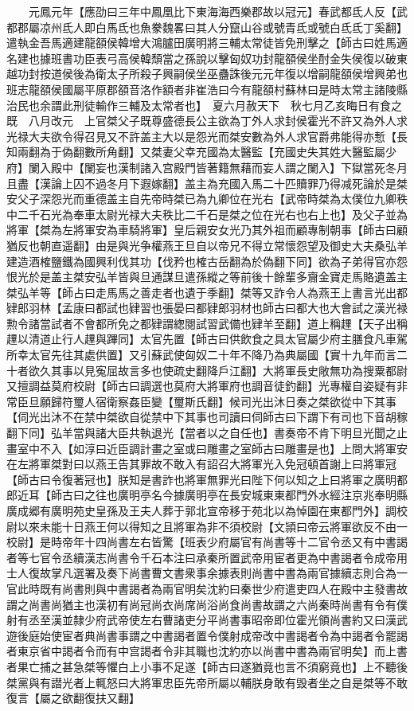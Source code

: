 　　元鳳元年【應劭曰三年中鳳凰比下東海海西樂郡故以冠元】春武都氐人反【武都郡屬凉州氐人即白馬氐也魚豢魏畧曰其人分竄山谷或號青氐或號白氐氐丁奚翻】遣執金吾馬適建龍頟侯韓增大鴻臚田廣明將三輔太常徒皆免刑擊之【師古曰姓馬適名建也據班書功臣表弓高侯韓頹當之孫說以擊匈奴功封龍頟侯坐酎金失侯復以破東越功封按道侯後為衛太子所殺子興嗣侯坐巫蠱誅後元元年復以增嗣龍頟侯增興弟也班志龍頟侯國屬平原郡頟音洛作額者非崔浩曰今有龍頟村蘇林曰是時太常主諸陵縣治民也余謂此刑徒輸作三輔及太常者也】　夏六月赦天下　秋七月乙亥晦日有食之既　八月改元　上官桀父子既尊盛德長公主欲為丁外人求封侯霍光不許又為外人求光禄大夫欲令得召見又不許盖主大以是怨光而桀安數為外人求官爵弗能得亦慙【長知兩翻為于偽翻數所角翻】又桀妻父幸充國為太醫監【充國史失其姓大醫監屬少府】闌入殿中【闌妄也漢制諸入宫殿門皆著籍無藉而妄人謂之闌入】下獄當死冬月且盡【漢論上囚不過冬月下遐嫁翻】盖主為充國入馬二十匹贖罪乃得减死論於是桀安父子深怨光而重德盖主自先帝時桀已為九卿位在光右【武帝時桀為太僕位九卿秩中二千石光為奉車太尉光禄大夫秩比二千石是桀之位在光右也右上也】及父子並為將軍【桀為左將軍安為車騎將軍】皇后親安女光乃其外祖而顧專制朝事【師古曰顧猶反也朝直遥翻】由是與光争權燕王旦自以帝兄不得立常懷怨望及御史大夫桑弘羊建造酒榷鹽鐵為國興利伐其功【伐矜也榷古岳翻為於偽翻下同】欲為子弟得官亦怨恨光於是盖主桀安弘羊皆與旦通謀旦遣孫縱之等前後十餘輩多齎金寶走馬賂遺盖主桀弘羊等【師占曰走馬馬之善走者也遺于季翻】桀等又詐令人為燕王上書言光出都肄郎羽林【孟康曰都試也肄習也張晏曰都肄郎羽材也師古曰都大也大會試之漢光禄勲令諸當試者不會都所免之都肄謂緫閱試習武備也肄羊至翻】道上稱䟆【天子出稱䟆以清道止行人䟆與蹕同】太官先置【師古曰供飲食之具太官屬少府主膳食凡車駕所幸太官先往其處供置】又引蘇武使匈奴二十年不降乃為典屬國【實十九年而言二十者欲久其事以見寃屈故言多也使疏史翻降戶江翻】大將軍長史敞無功為搜粟都尉又擅調益莫府校尉【師古曰調選也莫府大將軍府也調音徒釣翻】光專權自姿疑有非常臣旦願歸符璽人宿衛察姦臣變【璽斯氏翻】候司光出沐日奏之桀欲從中下其事【伺光出沐不在禁中桀欲自從禁中下其事也司讀曰伺師古曰下謂下有司也下音胡稼翻下同】弘羊當與諸大臣共執退光【當者以之自任也】書奏帝不肯下明旦光聞之止畫室中不入【如淳曰近臣調計畫之室或曰雕畫之室師古曰雕畫是也】上問大將軍安在左將軍桀對曰以燕王告其罪故不敢入有詔召大將軍光入免冠頓首謝上曰將軍冠【師古曰令復著冠也】朕知是書詐也將軍無罪光曰陛下何以知之上曰將軍之廣明都郎近耳【師古曰之往也廣明亭名今據廣明亭在長安城東東都門外水經注京兆奉明縣廣成郷有廣明苑史皇孫及王夫人葬于郭北宣帝移于苑北以為悼園在東都門外】調校尉以來未能十日燕王何以得知之且將軍為非不須校尉【文頴曰帝云將軍欲反不由一校尉】是時帝年十四尚書左右皆驚【班表少府屬官有尚書等十二官令丞又有中書謁者等七官令丞續漢志尚書令千石本注曰承秦所置武帝用宦者更為中書謁者令成帝用士人復故掌凡選署及奏下尚書曹文書衆事余據表則尚書中書為兩官據續志則合為一官此時既有尚書則與中書謁者為兩官明矣沈約曰秦世少府遣吏四人在殿中主發書故謂之尚書尚猶主也漢初有尚冠尚衣尚席尚浴尚食尚書故謂之六尚秦時尚書有令有僕射有丞至漢並隸少府武帝使左右曹諸吏分平尚書事昭帝即位霍光領尚書約又曰漢武遊後庭始使宦者典尚書事謂之中書謁者置令僕射成帝改中書謁者令為中謁者令罷謁者東京省中謁者令而有中宫謁者令非其職也沈約亦以尚書中書為兩官明矣】而上書者果亡捕之甚急桀等懼白上小事不足遂【師古曰遂猶竟也言不須窮竟也】上不聽後桀黨與有譛光者上輒怒曰大將軍忠臣先帝所屬以輔朕身敢有毁者坐之自是桀等不敢復言【屬之欲翻復扶又翻】

